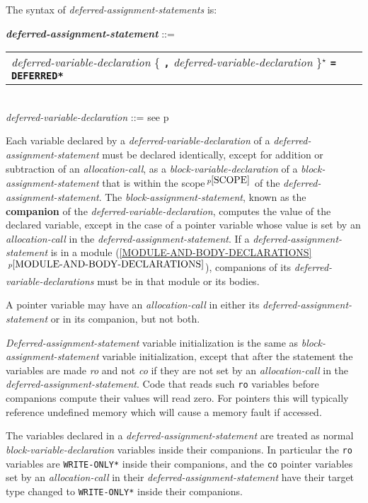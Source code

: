 \documentclass[12pt]{article}
\newcommand{\TT}[1]{{\tt \bfseries #1}}
\newcommand{\STAR}{{\Large $^\star$}}
\newcommand{\key}[1]{{\rm \bfseries #1}}
\newcommand{\ttkey}[1]{{\tt \bfseries #1}}
\newcommand{\emkey}[1]{{\em \bfseries #1}}
\newcommand{\itemref}[1]{\ref{#1}$\,^{p\pageref{#1}}$}
\newcommand{\pagref}[1]{p\pageref{#1}}
\newcommand{\pagnote}[1]{$\,^{p\pageref{#1}}$}
\newcommand{\EOL}{\penalty \exhyphenpenalty}
\newenvironment{indpar}[1][0.3in]%
	{\begin{list}{}%
		     {\setlength{\itemsep}{0in}%
		      \setlength{\topsep}{0in}%
		      \setlength{\parsep}{1ex}%
		      \setlength{\labelwidth}{#1}%
		      \setlength{\leftmargin}{#1}%
		      \addtolength{\leftmargin}{\labelsep}}%
	 \item}%
	{\end{list}}
\begin{document}
The syntax of {\em defer\-red-assignment-state\-ments} is:

\begin{indpar}
\emkey{deferred-assignment-statement} ::= \\
\hspace*{0.3in}
    \begin{tabular}[t]{@{}l}
        {\em deferred-variable-declaration}
                \{ \TT{,} {\em deferred-variable-declaration} \}\STAR{}
		     \TT{=} \ttkey{*DEFERRED*} \\
    \end{tabular}
\\[0.5ex]
{\em deferred-variable-declaration} ::=
    see \pagref{DEFERRED-VARIABLE-DECLARATION}
\end{indpar}

Each variable declared by a {\em deferred-variable-declaration}
of a {\em deferred-assignment-statement} must be declared identically,
except for addition or subtraction of an {\em allocation-call},
as a {\em block-variable-declaration} of a {\em block-assignment-statement}
that is within the scope\pagnote{SCOPE} of the
{\em deferred-assignment-statement}.  The {\em block-assignment-statement},
known as the \key{companion} of the {\em deferred-variable-declaration},
computes the value of the
declared variable, except in the case of a pointer variable whose value is
set by an {\em allocation-call} in the {\em deferred-assignment-statement}.
If a {\em deferred-assignment-statement} is in a module
(\itemref{MODULE-AND-BODY-DECLARATIONS}), companions
of its {\em deferred-variable-declarations}
must be in that module or its bodies.

A pointer variable may have an {\em allocation-call} in either its
{\em deferred-assignment-statement} or in its companion, but not
both.

{\em Deferred-assignment-statement} variable initialization is the
same as {\em block-assignment-state\-ment} variable initialization,
except that after the statement the variables
are made {\em ro} and not {\em co} if they are not set
by an {\em allocation-call} in the {\em deferred-assignment-statement}.
Code that reads such {\tt ro} variables
before companions compute their values will
read zero.  For pointers this will typically reference undefined memory which
will cause a memory fault if accessed.

The variables declared in a {\em deferred-assignment-statement} are treated as
normal {\em block-vari\-able-declaration} variables inside their companions.
In particular the {\tt ro} variables are {\tt *WRITE-\EOL ONLY*}
inside their companions, and the {\tt co} pointer variables set by
an {\em allocation-call} in their {\em deferred-assignment-statement}
have their target type changed to {\tt *WRITE-ONLY*}
inside their companions.
\end{document}
